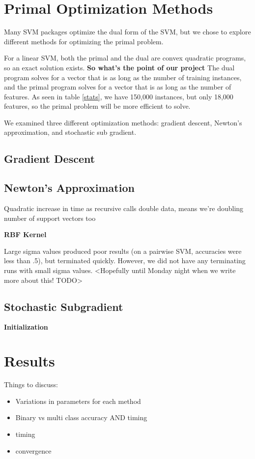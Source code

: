 \documentclass[letterpaper, 11pt]{article}
\begin{document}
\section{Primal Optimization Methods}
Many SVM packages optimize the dual form of the SVM, but we chose to explore different methods for optimizing the primal problem.

For a linear SVM, both the primal and the dual are convex quadratic programs, so an exact solution exists.  \textbf{So what's the point of our project}  The  dual program solves for a vector that is as long as the number of training instances, and the primal program solves for a vector that is as long as the number of features.  As seen in table \ref{stats}, we have 150,000 instances, but only 18,000 features, so the primal problem will be more efficient to solve.

We examined three different optimization methods: gradient descent, Newton's approximation, and stochastic sub gradient.

\subsection{Gradient Descent}

\subsection{Newton's Approximation}

Quadratic increase in time as recursive calls double data, means we're doubling number of support vectors too

\textbf{RBF Kernel}

Large sigma values produced poor results (on a pairwise SVM, accuracies were less than .5), but terminated quickly.  However, we did not have any terminating runs with small sigma values. <Hopefully until Monday night when we write more about this! TODO>


\subsection{Stochastic Subgradient}

\textbf{Initialization}


\section{Results}
Things to discuss:
\begin{itemize}
	\item Variations in parameters for each method
	\item Binary vs multi class accuracy AND timing
	\item timing
	\item convergence
\end{itemize}
\end{document}
